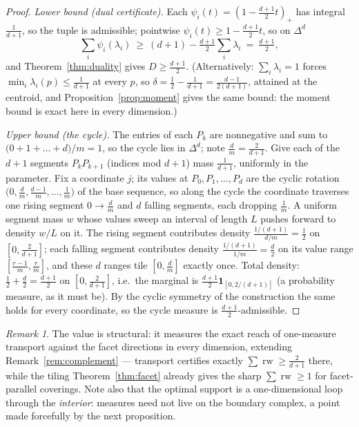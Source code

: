 \documentclass{aims}
\numberwithin{equation}{section}
\theoremstyle{plain}
\theoremstyle{definition}
\theoremstyle{remark}
\newtheorem{remark}[theorem]{Remark}
\newcommand{\rw}{\operatorname{rw}}
\begin{document}
\begin{proof}
\emph{Lower bound (dual certificate).} Each $\psi_i(t)=(1-\tfrac{d+1}2t)_+$
has integral $\tfrac1{d+1}$, so the tuple is admissible; pointwise
$\psi_i(t)\ge1-\tfrac{d+1}2t$, so on $\Delta^d$
\[
\textstyle\sum_i\psi_i(\lambda_i)\ \ge\ (d+1)-\tfrac{d+1}2\sum_i\lambda_i
\ =\ \tfrac{d+1}2 ,
\]
and Theorem~\ref{thm:duality} gives $D\ge\tfrac{d+1}2$. (Alternatively:
$\sum_i\lambda_i=1$ forces $\min_i\lambda_i(p)\le\tfrac1{d+1}$ at every $p$,
so $\delta=\tfrac12-\tfrac1{d+1}=\tfrac{d-1}{2(d+1)}$, attained at the
centroid, and Proposition~\ref{prop:moment} gives the same bound: the moment
bound is exact here in every dimension.)

\emph{Upper bound (the cycle).} The entries of each $P_k$ are nonnegative and
sum to $\bigl(0+1+\dots+d\bigr)/m=1$, so the cycle lies in $\Delta^d$; note
$\tfrac dm=\tfrac2{d+1}$. Give each of the $d+1$ segments $P_kP_{k+1}$
(indices mod $d+1$) mass $\tfrac1{d+1}$, uniformly in the parameter. Fix a
coordinate $j$; its values at $P_0,P_1,\dots,P_d$ are the cyclic rotation
$\bigl(0,\tfrac dm,\tfrac{d-1}m,\dots,\tfrac1m\bigr)$ of the base sequence,
so along the cycle the coordinate traverses one rising segment
$0\to\tfrac dm$ and $d$ falling segments, each dropping $\tfrac1m$. A uniform
segment mass $w$ whose values sweep an interval of length $L$ pushes forward
to density $w/L$ on it. The rising segment contributes density
$\frac{1/(d+1)}{d/m}=\tfrac12$ on $[0,\tfrac2{d+1}]$; each falling segment
contributes density $\frac{1/(d+1)}{1/m}=\tfrac d2$ on its value range
$[\tfrac{r-1}m,\tfrac rm]$, and these $d$ ranges tile $[0,\tfrac dm]$ exactly
once. Total density: $\tfrac12+\tfrac d2=\tfrac{d+1}2$ on
$[0,\tfrac2{d+1}]$, i.e.\ the marginal is
$\tfrac{d+1}2\mathbf1_{[0,2/(d+1)]}$ (a probability measure, as it must be).
By the cyclic symmetry of the construction the same holds for every
coordinate, so the cycle measure is $\tfrac{d+1}2$-admissible.
\end{proof}

\begin{remark}
The value is structural: it measures the exact reach of one-measure transport
against the facet directions in every dimension, extending
Remark~\ref{rem:complement} --- transport certifies exactly
$\sum\rw\ge\tfrac2{d+1}$ there, while the tiling Theorem~\ref{thm:facet}
already gives the sharp $\sum\rw\ge1$ for facet-parallel coverings. Note also
that the optimal support is a one-dimensional loop through the
\emph{interior}: measures need not live on the boundary complex, a point made
forcefully by the next proposition.
\end{remark}
\end{document}
